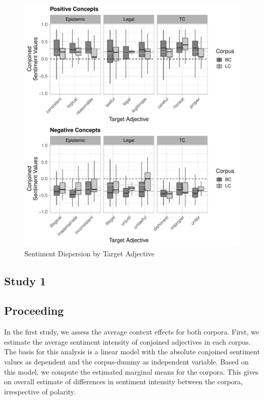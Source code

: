 \documentclass{article}
\begin{document}
\begin{figure}[!ht]
\center
\includegraphics[width=.9\textwidth, keepaspectratio]{bc_lc_summary_stats_adj-distr}
\caption{Sentiment Dispersion by Target Adjective}
\label{fig:SDta}
\end{figure}


\subsection{Study 1}

\subsection{Proceeding}

In the first study, we assess the average context effects for both corpora. First, we estimate the average sentiment intensity of conjoined adjectives in each corpus. The basis for this analysis is a linear model with the absolute conjoined sentiment values as dependent and the corpus-dummy as independent variable. Based on this model, we compute the estimated marginal means for the corpora. This gives on overall estimate of differences in sentiment intensity between the corpora, irrespective of polarity. 
\end{document}

